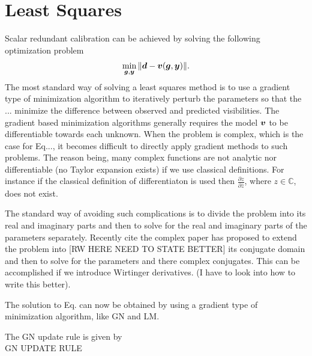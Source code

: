 \documentclass[useAMS,usenatbib]{mn2e}
\newcommand{\bg}{\bmath{g}}
\newcommand{\bd}{\bmath{d}}
\newcommand{\bv}{\bmath{v}}
\newcommand{\by}{\bmath{y}}
\newcommand{\conj}[1]{\overline{#1}}
\begin{document}
\section{Least Squares}
Scalar redundant calibration can be achieved by solving the following optimization problem
\begin{equation}
\min_{\bg,\by} \|\bd - \bv(\bg,\by)\|. 
\end{equation}
The most standard way of solving a least squares method is to use a gradient type of minimization algorithm to iteratively perturb the parameters so that the ... minimize the 
difference between observed and predicted visibilities. The gradient based minimization algorithms generally requires the model $\bv$ to be differentiable
towards each unknown. When the problem is complex, which is the case for Eq..., it becomes difficult to directly apply gradient methods to such problems. The reason being,
many complex functions are not analytic nor differentiable (no Taylor expansion exists) if we use classical definitions. For instance if the 
classical definition of differentiaton is used then $\frac{\partial z}{\partial \conj{z}}$, where $z \in \mathbb{C}$, does not exist.

The standard way of avoiding such complications is to divide the problem into its real and imaginary parts and then to solve for the real and imaginary parts of the parameters separately.
Recently cite the complex paper has proposed to extend the problem into [RW HERE NEED TO STATE BETTER] its conjugate domain and then to solve for the parameters and there complex conjugates. This can be accomplished
if we introduce Wirtinger derivatives. (I have to look into how to write this better).

The solution to Eq. can now be obtained by using a gradient type of minimization algorithm, like GN and LM. 

The GN update rule is given by\\

GN UPDATE RULE
\end{document}

